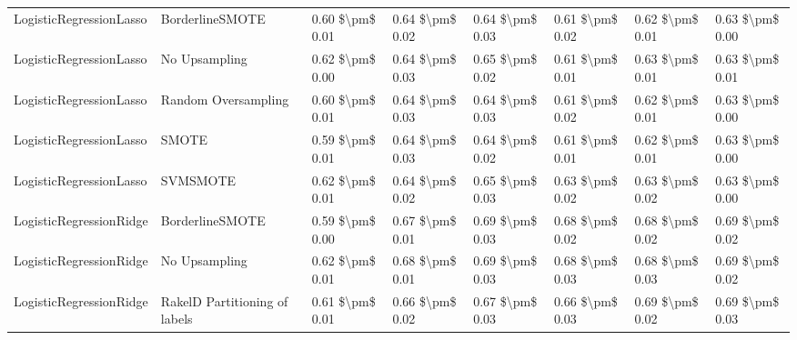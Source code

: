 \begin{tabular}{llllllll}
        LogisticRegressionLasso &               BorderlineSMOTE & 0.60 \$\textbackslash pm\$ 0.01 &           0.64 \$\textbackslash pm\$ 0.02 &       0.64 \$\textbackslash pm\$ 0.03 &        0.61 \$\textbackslash pm\$ 0.02 &                         0.62 \$\textbackslash pm\$ 0.01 & 0.63 \$\textbackslash pm\$ 0.00 \\
        LogisticRegressionLasso &                 No Upsampling & 0.62 \$\textbackslash pm\$ 0.00 &           0.64 \$\textbackslash pm\$ 0.03 &       0.65 \$\textbackslash pm\$ 0.02 &        0.61 \$\textbackslash pm\$ 0.01 &                         0.63 \$\textbackslash pm\$ 0.01 & 0.63 \$\textbackslash pm\$ 0.01 \\
        LogisticRegressionLasso &           Random Oversampling & 0.60 \$\textbackslash pm\$ 0.01 &           0.64 \$\textbackslash pm\$ 0.03 &       0.64 \$\textbackslash pm\$ 0.03 &        0.61 \$\textbackslash pm\$ 0.02 &                         0.62 \$\textbackslash pm\$ 0.01 & 0.63 \$\textbackslash pm\$ 0.00 \\
        LogisticRegressionLasso &                         SMOTE & 0.59 \$\textbackslash pm\$ 0.01 &           0.64 \$\textbackslash pm\$ 0.03 &       0.64 \$\textbackslash pm\$ 0.02 &        0.61 \$\textbackslash pm\$ 0.01 &                         0.62 \$\textbackslash pm\$ 0.01 & 0.63 \$\textbackslash pm\$ 0.00 \\
        LogisticRegressionLasso &                      SVMSMOTE & 0.62 \$\textbackslash pm\$ 0.01 &           0.64 \$\textbackslash pm\$ 0.02 &       0.65 \$\textbackslash pm\$ 0.03 &        0.63 \$\textbackslash pm\$ 0.02 &                         0.63 \$\textbackslash pm\$ 0.02 & 0.63 \$\textbackslash pm\$ 0.00 \\
        LogisticRegressionRidge &               BorderlineSMOTE & 0.59 \$\textbackslash pm\$ 0.00 &           0.67 \$\textbackslash pm\$ 0.01 &       0.69 \$\textbackslash pm\$ 0.03 &        0.68 \$\textbackslash pm\$ 0.02 &                         0.68 \$\textbackslash pm\$ 0.02 & 0.69 \$\textbackslash pm\$ 0.02 \\
        LogisticRegressionRidge &                 No Upsampling & 0.62 \$\textbackslash pm\$ 0.01 &           0.68 \$\textbackslash pm\$ 0.01 &       0.69 \$\textbackslash pm\$ 0.03 &        0.68 \$\textbackslash pm\$ 0.03 &                         0.68 \$\textbackslash pm\$ 0.03 & 0.69 \$\textbackslash pm\$ 0.02 \\
        LogisticRegressionRidge & RakelD Partitioning of labels & 0.61 \$\textbackslash pm\$ 0.01 &           0.66 \$\textbackslash pm\$ 0.02 &       0.67 \$\textbackslash pm\$ 0.03 &        0.66 \$\textbackslash pm\$ 0.03 &                         0.69 \$\textbackslash pm\$ 0.02 & 0.69 \$\textbackslash pm\$ 0.03 \\

\end{tabular}
